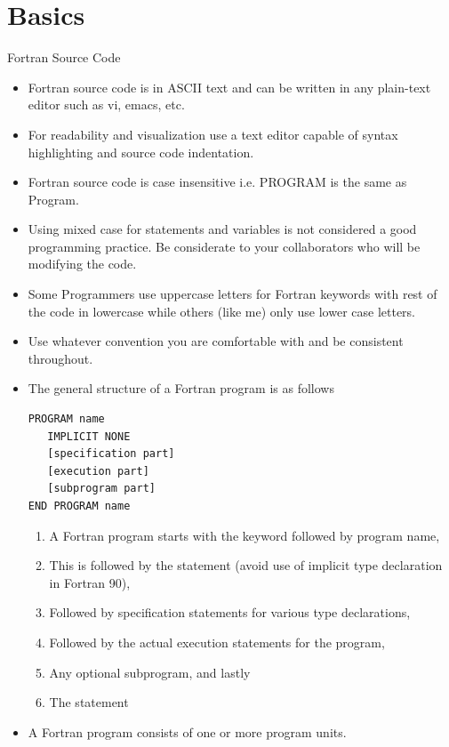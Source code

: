 \documentclass[10pt,t]{beamer}
\begin{document}
\section{Basics}
\begin{frame}{Fortran Source Code}
  \begin{itemize}
    \item Fortran source code is in ASCII text and can be written in any plain-text editor such as vi, emacs, etc.
    \item For readability and visualization use a text editor capable of syntax highlighting and source code indentation.
    \item Fortran source code is case insensitive i.e. PROGRAM is the same as Program.
    \item Using mixed case for statements and variables is not considered a good programming practice. Be considerate to your collaborators who will be modifying the code.
    \item Some Programmers use uppercase letters for Fortran keywords with rest of the code in lowercase while others (like me) only use lower case letters.
    \item Use whatever convention you are comfortable with and be consistent throughout.
      \framebreak
    \item The general structure of a Fortran program is as follows
      \begin{lstlisting}[language={[90]Fortran}]
PROGRAM name
   IMPLICIT NONE
   [specification part]
   [execution part]
   [subprogram part]
END PROGRAM name
      \end{lstlisting}
      \begin{enumerate}
        \item A Fortran program starts with the keyword  followed by program name,
        \item This is followed by the  statement (avoid use of implicit type declaration in Fortran 90),
        \item Followed by specification statements for various type declarations,
        \item Followed by the actual execution statements for the program,
        \item Any optional subprogram, and lastly
        \item The  statement
      \end{enumerate}
      \framebreak
    \item A Fortran program consists of one or more program units.

\end{itemize}
\end{frame}
\end{document}
